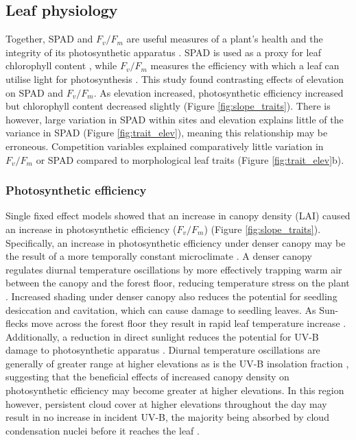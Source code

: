 \documentclass[a4paper,11pt]{article}
\begin{document}
\subsection*{Leaf physiology}
Together, SPAD and $F_v/F_m$ are useful measures of a plant's health and the integrity of its photosynthetic apparatus \citep{Clark2000}. SPAD is used as a proxy for leaf chlorophyll content \citep{Richardson2002}, while $F_v/F_m$ measures the efficiency with which a leaf can utilise light for photosynthesis \citep{Maxwell2000}. This study found contrasting effects of elevation on SPAD and $F_v/F_m$. As elevation increased, photosynthetic efficiency increased but chlorophyll content decreased slightly (Figure \ref{fig:slope_traits}). There is however, large variation in SPAD within sites and elevation explains little of the variance in SPAD (Figure \ref{fig:trait_elev}), meaning this relationship may be erroneous. Competition variables explained comparatively little variation in $F_v/F_m$ or SPAD compared to morphological leaf traits (Figure \ref{fig:trait_elev}b).

\subsubsection*{Photosynthetic efficiency}
Single fixed effect models showed that an increase in canopy density (LAI) caused an increase in photosynthetic efficiency ($F_v/F_m$) (Figure \ref{fig:slope_traits}). Specifically, an increase in photosynthetic efficiency under denser canopy may be the result of a more temporally constant microclimate \citep{Amissah2015}. A denser canopy regulates diurnal temperature oscillations by more effectively trapping warm air between the canopy and the forest floor, reducing temperature stress on the plant \citep{Larcher2003}. Increased shading under denser canopy also reduces the potential for seedling desiccation and cavitation, which can cause damage to seedling leaves. As Sun-flecks move across the forest floor they result in rapid leaf temperature increase \citep{Rozendaal2006, Poorter2010}. Additionally, a reduction in direct sunlight reduces the potential for UV-B damage to photosynthetic apparatus \citep{Dobrikova2013}. Diurnal temperature oscillations are generally of greater range at higher elevations \citep{Seidel2005} as is the UV-B insolation fraction \citep{Piazena1996}, suggesting that the beneficial effects of increased canopy density on photosynthetic efficiency may become greater at higher elevations. In this region however, persistent cloud cover at higher elevations throughout the day may result in no increase in incident UV-B, the majority being absorbed by cloud condensation nuclei before it reaches the leaf \citep{Flint2003}.
\end{document}
